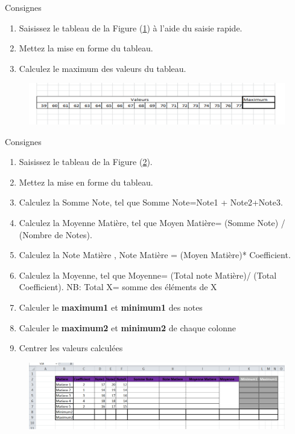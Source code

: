 \begin{exercice}\label{ex12}
	Consignes 
	\begin{enumerate}		
		\item  Saisissez le tableau  de la Figure (\ref{exo12}) à l'aide du saisie rapide.  				
		\item  Mettez la mise en forme  du tableau.
		\item  Calculez le maximum des valeurs du tableau.
	\end{enumerate}	
\end{exercice}
\begin{figure}[H]
	\centering
	\includegraphics[scale=0.2,width= \linewidth]{img/ex012}
	 \label{exo12}
\end{figure}

\begin{exercice}\label{ex13}
	Consignes 
	\begin{enumerate}		
		\item  Saisissez le tableau  de la Figure (\ref{exo13}).  				
		\item  Mettez la mise en forme  du tableau.
		\item  Calculez la Somme Note,  tel que Somme Note=Note1 + Note2+Note3.
		\item  Calculez la Moyenne Matière,  tel que Moyen Matière= (Somme Note) / (Nombre de Notes).
		\item  Calculez la Note Matière ,  Note Matière = (Moyen Matière)* Coefficient.
		\item  Calculez la Moyenne,  tel que Moyenne= (Total note Matière)/ (Total Coefficient).
		\subitem NB: Total X= somme des éléments de X
		\item Calculer le \textbf{maximum1} et \textbf{minimum1} des notes
		\item Calculer le \textbf{maximum2} et \textbf{minimum2} de chaque colonne
		\item Centrer les valeurs calculées			
	\end{enumerate}	
\end{exercice}
\begin{figure}[H]
	\centering
	\includegraphics[scale=0.2,width= \linewidth]{img/ex013}
	 \label{exo13}
\end{figure}


